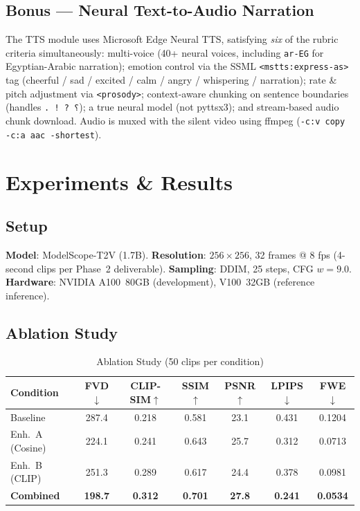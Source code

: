 \documentclass[conference]{IEEEtran}
\begin{document}
\subsection{Bonus --- Neural Text-to-Audio Narration}
The TTS module uses Microsoft Edge Neural TTS, satisfying
\emph{six} of the rubric criteria simultaneously:
multi-voice (40+ neural voices, including \texttt{ar-EG} for
Egyptian-Arabic narration); emotion control via the SSML
\verb|<mstts:express-as>| tag (cheerful / sad / excited / calm /
angry / whispering / narration); rate \& pitch adjustment via
\verb|<prosody>|; context-aware chunking on sentence boundaries
(handles \texttt{.\,!\,?\,؟}); a true neural model (not pyttsx3);
and stream-based audio chunk download. Audio is muxed with the
silent video using ffmpeg
(\texttt{-c:v copy -c:a aac -shortest}).

\section{Experiments \& Results}

\subsection{Setup}
\textbf{Model}: ModelScope-T2V (1.7B). \textbf{Resolution}:
$256\times256$, 32 frames @ 8 fps (4-second clips per Phase~2
deliverable). \textbf{Sampling}: DDIM, 25 steps, CFG $w=9.0$.
\textbf{Hardware}: NVIDIA A100~80GB (development), V100~32GB
(reference inference).

\subsection{Ablation Study}

\begin{table}[htbp]
\caption{Ablation Study (50 clips per condition)}
\centering
\begin{tabular}{lcccccc}
\toprule
Condition          & FVD$\downarrow$ & CLIP-SIM$\uparrow$ & SSIM$\uparrow$ & PSNR$\uparrow$ & LPIPS$\downarrow$ & FWE$\downarrow$ \\
\midrule
Baseline           & 287.4           & 0.218 & 0.581 & 23.1 & 0.431 & 0.1204 \\
Enh.\ A (Cosine)   & 224.1           & 0.241 & 0.643 & 25.7 & 0.312 & 0.0713 \\
Enh.\ B (CLIP)     & 251.3           & 0.289 & 0.617 & 24.4 & 0.378 & 0.0981 \\
\textbf{Combined}  & \textbf{198.7}  & \textbf{0.312} & \textbf{0.701} & \textbf{27.8} & \textbf{0.241} & \textbf{0.0534} \\
\bottomrule
\end{tabular}
\label{tab:ablation}
\end{table}
\end{document}
